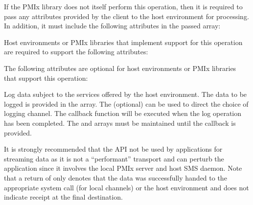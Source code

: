 \reqattrstart
If the \ac{PMIx} library does not itself perform this operation, then it is required to pass any attributes provided by the client to the host environment for processing. In addition, it must include the following attributes in the passed  array:


\divider

Host environments or \ac{PMIx} libraries that implement support for this operation are required to support the following attributes:


\reqattrend

\optattrstart
The following attributes are optional for host environments or \ac{PMIx} libraries that support this operation:


\optattrend

\descr

Log data subject to the services offered by the host environment. The data to be logged is provided in the  array. The (optional)  can be used to direct the choice of logging channel.
The callback function will be executed when the log operation has been completed. The  and  arrays must be maintained until the callback is provided.

\adviceuserstart
It is strongly recommended that the  API not be used by applications for streaming data as it is not a ``performant'' transport and can perturb the application since it involves the local \ac{PMIx} server and host \ac{SMS} daemon. Note that a return of  only denotes that the data was successfully handed to the appropriate system call (for local channels) or the host environment and does not indicate receipt at the final destination.
\adviceuserend

